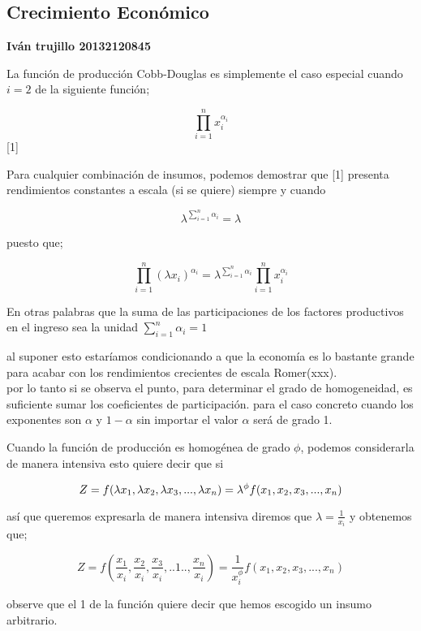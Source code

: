 \documentclass[12pt,a4paper,  titlepage]{article}
\begin{document}
\subsection*{Crecimiento Económico}{\bf{Iván trujillo 20132120845}}

\vspace*{0,9cm}


La función de producción Cobb-Douglas es simplemente el caso especial cuando $i=2$ de la siguiente función;

$$\prod_{i=1}^n x_i^{\alpha_i}  $$ [1]

Para cualquier combinación de insumos, podemos demostrar que [1] presenta rendimientos constantes a escala (si se quiere) siempre y cuando 

 $$ \lambda^{\sum_{i=1}^n\alpha{_i}}=\lambda $$
 
 
puesto que; 



$$\prod_{i=1}^n \left(\lambda x_i \right)^{\alpha_i}=\lambda^{{\sum_{i=1}^n\alpha_i}}\prod_{i=1}^n x_i^{\alpha_i}$$
 
 
 
 
 En otras palabras que la suma de las participaciones de los factores productivos en el ingreso sea la unidad $\sum_{i=1}^n\alpha{_i}=1$
 
 al suponer esto estaríamos condicionando a que la economía es lo bastante grande para acabar con los rendimientos crecientes de escala Romer(xxx).
\\ 
 
 por lo tanto si se observa el punto, para determinar el grado de homogeneidad, es suficiente sumar los coeficientes de participación.
para el caso concreto cuando los exponentes son $\alpha$ y $1-\alpha$ sin importar el valor $\alpha$ será de grado 1. 

Cuando la función de producción es homogénea de grado $\phi$, podemos considerarla de manera intensiva esto quiere decir que si

 
$$Z=f(\lambda x_1,\lambda x_2,\lambda x_3,...,\lambda x_n)\\ =
\lambda^{\phi}f(x_1,x_2,x_3,...,x_n) $$

así que queremos expresarla de manera intensiva diremos que $\lambda=\frac{1}{x_{i}}$
y obtenemos que;


$$Z=f( \dfrac{x_1}{x_i},\dfrac{x_2}{x_i},\dfrac{x_3}{x_i},..1..,\dfrac{x_n}{x_i}) =
\dfrac{1}{x_i^{\phi}}f(x_1,x_2,x_3,...,x_n) $$

observe que el 1 de la función quiere decir que hemos escogido un insumo arbitrario. 
\end{document}
